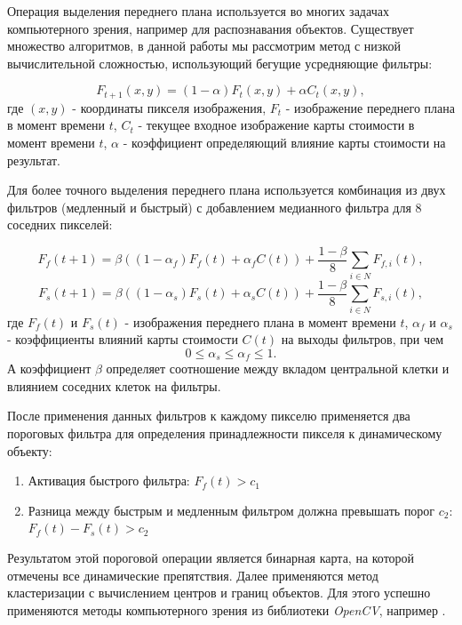 Операция выделения переднего плана используется во многих задачах компьютерного зрения, например для распознавания объектов. Существует множество алгоритмов, в данной работы мы рассмотрим метод с низкой вычислительной сложностью, использующий бегущие усредняющие фильтры:

\begin{equation}
    \label{eq:e7}
    F_{t+1}(x,y) = (1 - \alpha)F_t(x,y) + \alpha C_t(x,y),
\end{equation}
где $(x,y)$ - координаты пикселя изображения, $F_t$ - изображение переднего плана в момент времени $t$, $C_t$ - текущее входное изображение карты стоимости в момент времени $t$, $\alpha$ - коэффициент определяющий влияние карты стоимости на результат.

Для более точного выделения переднего плана используется комбинация из двух фильтров (медленный и быстрый) с добавлением медианного фильтра для 8 соседних пикселей:

\begin{equation}
    \label{eq:e8}
    F_f(t+1) = \beta ((1-\alpha_f)F_f(t) + \alpha_f C(t)) + \frac{1 - \beta}{8} \sum_{i \in N} F_{f,i}(t),
\end{equation}
\begin{equation}
    \label{eq:e9}
    F_s(t+1) = \beta ((1-\alpha_s)F_s(t) + \alpha_s C(t)) + \frac{1 - \beta}{8} \sum_{i \in N} F_{s,i}(t),
\end{equation}
где $F_f(t)$ и $F_s(t)$ - изображения переднего плана в момент времени $t$, $\alpha_f$ и $\alpha_s$ - коэффициенты влияний карты стоимости $C(t)$ на выходы фильтров, при чем 
\begin{equation}
    0 \leq \alpha_s \leq \alpha_f \leq 1.
\end{equation}
А коэффициент $\beta$ определяет соотношение между вкладом центральной клетки и влиянием соседних клеток на фильтры.

После применения данных фильтров к каждому пикселю применяется два пороговых фильтра для определения принадлежности пикселя к динамическому объекту:
\begin{enumerate}
    \item Активация быстрого фильтра: $F_f(t) > c_1$
    \item Разница между быстрым и медленным фильтром должна превышать порог $c_2$: $F_f(t) - F_s(t) > c_2$
\end{enumerate}

Результатом этой пороговой операции является бинарная карта, на которой отмечены все динамические препятствия. Далее применяются метод кластеризации с вычислением центров и границ объектов. Для этого успешно применяются методы компьютерного зрения из библиотеки \textit{OpenCV}, например \cite{opencv-blobs}.

